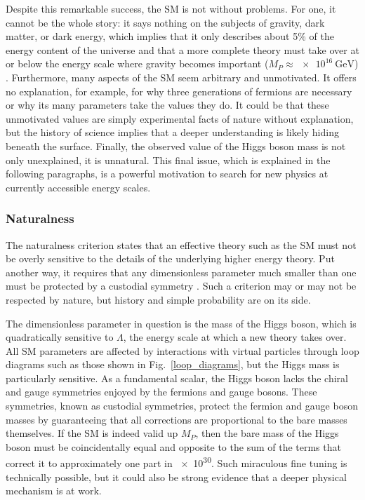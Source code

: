 Despite this remarkable success, the SM is not without problems. For one, it cannot be the whole story: it says nothing on the subjects of gravity, dark matter, or dark energy, which implies that it only describes about 5\% of the energy content of the universe  and that a more complete theory must take over at or below the energy scale where gravity becomes important ($M_{P}\approx\SI{e16}{\GeV}$) . Furthermore, many aspects of the SM seem arbitrary and unmotivated. It offers no explanation, for example, for why three generations of fermions are necessary or why its many parameters take the values they do. It could be that these unmotivated values are simply experimental facts of nature without explanation, but the history of science implies that a deeper understanding is likely hiding beneath the surface. Finally, the observed value of the Higgs boson mass is not only unexplained, it is unnatural. This final issue, which is explained in the following paragraphs, is a powerful motivation to search for new physics at currently accessible energy scales.

\subsubsection{Naturalness}
The naturalness criterion states that an effective theory such as the SM must not be overly sensitive to the details of the underlying higher energy theory. Put another way, it requires that any dimensionless parameter much smaller than one must be protected by a custodial symmetry . Such a criterion may or may not be respected by nature, but history and simple probability are on its side.

The dimensionless parameter in question is the mass of the Higgs boson, which is quadratically sensitive to $\Lambda$, the energy scale at which a new theory takes over. All SM parameters are affected by interactions with virtual particles through loop diagrams such as those shown in Fig.~\ref{loop_diagrams}, but the Higgs mass is particularly sensitive. As a fundamental scalar, the Higgs boson lacks the chiral and gauge symmetries enjoyed by the fermions and gauge bosons. These symmetries, known as custodial symmetries, protect the fermion and gauge boson masses by guaranteeing that all corrections are proportional to the bare masses themselves. If the SM is indeed valid up $M_{P}$, then the bare mass of the Higgs boson must be coincidentally equal and opposite to the sum of the terms that correct it to approximately one part in \num{e30}. Such miraculous fine tuning is technically possible, but it could also be strong evidence that a deeper physical mechanism is at work.



